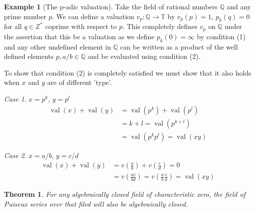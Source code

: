 \documentclass[12pt,a4paper]{amsart}
\newcommand{\val}[1]{\operatorname{val}(#1)}
\newcommand{\Z}{\mathbb{Z}}
\newcommand{\Q}{\mathbb{Q}}
\newcommand{\T}{\mathbb{T}}
\newcommand{\K}{K}
\newtheorem{thm}{Theorem}[section]
\theoremstyle{definition}
\newtheorem{ex}{Example}[section]
\theoremstyle{remark}
\newtheorem{case}{Case}
\begin{document}
\begin{ex}[The p-adic valuation]
Take the field of rational numbers $\Q$ and any prime number $p$. We can define a valuation $v_p:\Q\to\T$ by $v_p(p)=1$, $p_k(q) = 0$ for all $q\in\Z^*$ coprime with respect to $p$. This completely defines $v_p$ on $\Q$ under the assertion that this be a valuation as we define $p_k(0) = \infty$ by condition (1) and any other undefined element in $\Q$ can be written as a product of the well defined elements $p, a/b\in\Q$ and be evaluated using condition (2).

To show that condition (2) is completely satisfied we must show that it also holds when $x$ and $y$ are of different 'type'.
\begin{case}
$x = p^k$, $y = p^l$
\begin{align*}
    \val{x} + \val{y} &= \val{p^k} + \val{p^l}\\
    &= k+l = \val{p^{k+l}}\\
    &= \val{p^k p^l} = \val{xy}
\end{align*}
\end{case}
\begin{case}
$x = a/b$, $y = c/d$
\begin{align*}
    \val{x} + \val{y} &= v\left(\frac{a}{b}\right) + v\left(\frac{c}{d}\right) = 0\\
    &= v\left(\frac{ac}{bd}\right) = v\left(\frac{a}{b}\frac{c}{d}\right) = 
    \val{xy}
\end{align*}
\end{case}
\end{ex}


\begin{thm}\label{thm:PuiseuxClosed}
For any algebraically closed field of characteristic zero, the field of Puiseux series over that filed will also be algebraically closed.
\end{thm}
\end{document}
